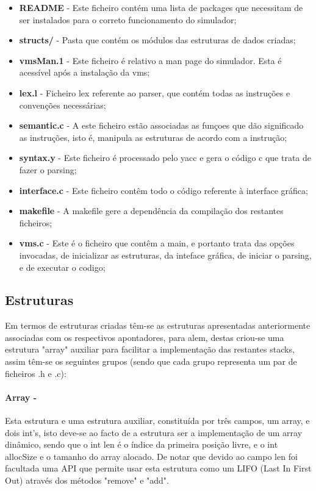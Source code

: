 \documentclass{report}
\begin{document}
\begin{itemize}
\item \textbf{README} - Este ficheiro contém uma lista de packages que necessitam de ser instalados para o correto funcionamento do simulador;
\item \textbf{structs/} - Pasta que contém os módulos das estruturas de dados criadas;
\item \textbf{vmsMan.1} - Este ficheiro é relativo a man page do simulador. Esta é acessível após a instalação da vms;
\item \textbf{lex.l} - Ficheiro lex referente ao parser, que contém todas as instruções e convenções necessárias;
\item \textbf{semantic.c} - A este ficheiro estão associadas as funçoes que dão significado as instruções, isto é, manipula as estruturas de acordo com a instrução;
\item \textbf{syntax.y} - Este ficheiro é processado pelo yacc e gera o código c que trata de fazer o parsing;
\item \textbf{interface.c} - Este ficheiro contêm todo o código referente à interface gráfica;
\item \textbf{makefile} - A makefile gere a dependência da compilação dos restantes ficheiros;
\item \textbf{vms.c} - Este é o ficheiro que contêm a main, e portanto trata das opções invocadas, de inicializar as estruturas, da inteface gráfica, de iniciar o parsing, e de executar o codigo;
\end{itemize}

\subsection{Estruturas}

\quad Em termos de estruturas criadas têm-se as estruturas apresentadas anteriormente associadas com os respectivos apontadores, para alem, destas criou-se uma estrutura "array" auxiliar para facilitar a implementação das restantes stacks, assim têm-se os seguintes grupos
(sendo que cada grupo representa um par de ficheiros .h e .c):

\paragraph{\quad Array - }
Esta estrutura e uma estrutura auxiliar, constituída por três campos, um array, e dois int's, isto deve-se ao facto de a estrutura ser a
implementação de um array dinâmico, sendo que o int len é o índice da primeira posição livre, e o int allocSize e o tamanho do array alocado.
De notar que devido ao campo len foi facultada uma API que permite usar esta estrutura como um LIFO (Last In First Out) através dos
métodos "remove" e "add".
\end{document}
